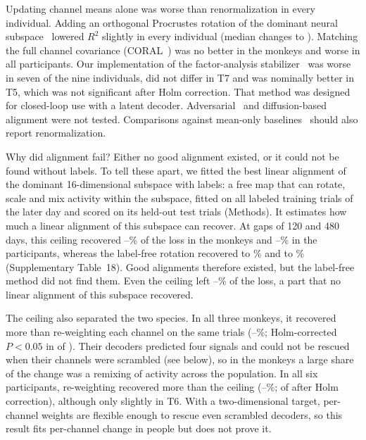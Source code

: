 \documentclass{iopjournal}
\begin{document}
Updating channel means alone was worse than renormalization in every individual. Adding an orthogonal Procrustes
rotation of the dominant neural subspace~\cite{schonemann1966} lowered $R^2$ slightly in every individual (median changes
 to ). Matching the full channel covariance (CORAL~\cite{sun2016}) was no
better in the monkeys and worse in all  participants. Our implementation of the factor-analysis
stabilizer~\cite{degenhart2020} was worse in seven of the nine individuals, did not differ in T7 and was nominally better
in T5, which was not significant after Holm correction. That method was designed for closed-loop use with a latent
decoder. Adversarial~\cite{farshchian2019,ma2023,karpowicz2025} and diffusion-based~\cite{wang2023erdiff} alignment
were not tested. Comparisons against mean-only
baselines~\cite{wilson2025} should also report renormalization.

Why did alignment fail? Either no good alignment existed, or it could not be found without labels. To tell these apart,
we fitted the best linear alignment of the dominant 16-dimensional subspace with labels: a free map that can rotate,
scale and mix activity within the subspace, fitted on all labeled training trials of the later day and scored on its
held-out test trials (Methods). It estimates how much a linear alignment of this subspace can recover. At gaps of 120
and 480 days, this ceiling recovered --\% of the loss in the monkeys and
--\% in the participants, whereas the label-free rotation recovered
 to \% and  to \%
(Supplementary Table~18). Good alignments therefore existed, but the label-free method did not find them. Even the
ceiling left --\% of the loss, a part that no linear alignment of this
subspace recovered.

The ceiling also separated the two species. In all three monkeys, it recovered more than re-weighting each channel on
the same trials (--\%; Holm-corrected $P < 0.05$ in
 of ). Their decoders predicted four signals and could not be rescued when
their channels were scrambled (see below), so in the monkeys a large share of the change was a remixing of activity
across the population. In all six participants, re-weighting recovered more than the ceiling
(--\%;  of  after Holm correction),
although only slightly in T6. With a two-dimensional target, per-channel weights are flexible enough to rescue even
scrambled decoders, so this result fits per-channel change in people but does not prove it.
\end{document}
